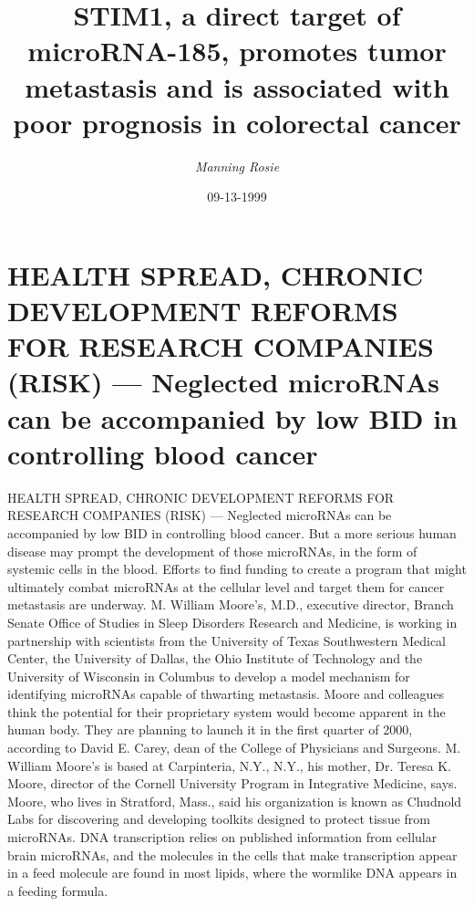 \documentclass{article}%
\title{STIM1, a direct target of microRNA{-}185, promotes tumor metastasis and is associated with poor prognosis in colorectal cancer}%
\author{\textit{Manning Rosie}}%
\date{09-13-1999}%
\begin{document}
%
\normalsize%
\maketitle%
\section{HEALTH SPREAD, CHRONIC DEVELOPMENT REFORMS FOR RESEARCH COMPANIES\newline%
(RISK) — Neglected microRNAs can be accompanied by low BID in controlling blood cancer}%
\label{sec:HEALTHSPREAD,CHRONICDEVELOPMENTREFORMSFORRESEARCHCOMPANIES(RISK)NeglectedmicroRNAscanbeaccompaniedbylowBIDincontrollingbloodcancer}%
HEALTH SPREAD, CHRONIC DEVELOPMENT REFORMS FOR RESEARCH COMPANIES\newline%
(RISK) — Neglected microRNAs can be accompanied by low BID in controlling blood cancer. But a more serious human disease may prompt the development of those microRNAs, in the form of systemic cells in the blood.\newline%
Efforts to find funding to create a program that might ultimately combat microRNAs at the cellular level and target them for cancer metastasis are underway.\newline%
M. William Moore’s, M.D., executive director, Branch Senate Office of Studies in Sleep Disorders Research and Medicine, is working in partnership with scientists from the University of Texas Southwestern Medical Center, the University of Dallas, the Ohio Institute of Technology and the University of Wisconsin in Columbus to develop a model mechanism for identifying microRNAs capable of thwarting metastasis.\newline%
Moore and colleagues think the potential for their proprietary system would become apparent in the human body. They are planning to launch it in the first quarter of 2000, according to David E. Carey, dean of the College of Physicians and Surgeons.\newline%
M. William Moore’s is based at Carpinteria, N.Y., N.Y., his mother, Dr. Teresa K. Moore, director of the Cornell University Program in Integrative Medicine, says.\newline%
Moore, who lives in Stratford, Mass., said his organization is known as Chudnold Labs for discovering and developing toolkits designed to protect tissue from microRNAs. DNA transcription relies on published information from cellular brain microRNAs, and the molecules in the cells that make transcription appear in a feed molecule are found in most lipids, where the wormlike DNA appears in a feeding formula.\newline%
\end{document}
